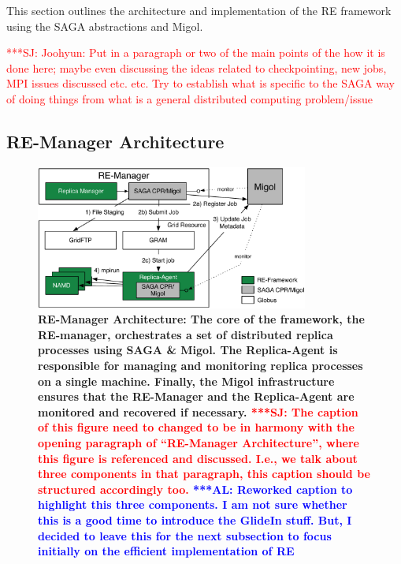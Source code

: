 \documentclass{rspublic}
\newcommand{\alnote}[1]{ {\textcolor{blue} { ***AL: #1 }}}
\newcommand{\jhanote}[1]{ {\textcolor{red} { ***SJ: #1 }}}
\newcommand{\alnote}[1]{}
\newcommand{\jhanote}[1]{}
\begin{document}
This section outlines the architecture and implementation of the RE framework
using the SAGA abstractions and Migol.

\jhanote{Joohyun: Put in a paragraph or two of the main points of the
  how it is done here; maybe even discussing the ideas related to
  checkpointing, new jobs, MPI issues discussed etc. etc. Try to
  establish what is specific to the SAGA way of doing things from what
  is a general distributed computing problem/issue}
          
\subsection{RE-Manager Architecture}

\begin{figure}[t]
      \centering
          \includegraphics[width=0.8\textwidth]{REMDgManager-architecture.pdf}
          \caption{\footnotesize \bf RE-Manager Architecture: The
            core of the framework, the RE-manager, orchestrates 
            a set of distributed replica processes using SAGA \& Migol. 
            The Replica-Agent is responsible for managing and monitoring 
            replica processes on a single machine. Finally, the Migol 
            infrastructure ensures that the RE-Manager and the Replica-Agent 
            are monitored and recovered if necessary.            
            \jhanote{The caption of this
              figure need to changed to be in harmony with the opening
              paragraph of ``RE-Manager Architecture'', where this
              figure is referenced and discussed. I.e., we talk about
              three components in that paragraph, this caption should
              be structured accordingly too.}
              \alnote{Reworked caption to highlight this three components. 
              I am not sure whether this is a good time to introduce the GlideIn stuff. But, I 
              decided to leave this for the next subsection to focus initially on
              the efficient implementation of RE}
              }
      \label{fig:REMD-Manager-architecture}
\end{figure}
\end{document}
